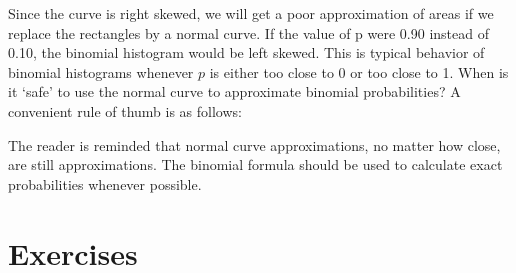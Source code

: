\documentclass[11pt, chapterprefix=true]{scrbook}\usepackage[]{graphicx}\usepackage[]{color}
\begin{document}
Since the curve is right skewed, we will get a poor approximation of areas if we replace the rectangles by a normal curve.  If the value of p were 0.90 instead of 0.10, the binomial histogram would be left skewed.  This is typical behavior of binomial histograms whenever $p$ is either too close to 0 or too close to 1.  When is it `safe' to use the normal curve to approximate binomial probabilities?  A convenient rule of thumb is as follows:


The reader is reminded that normal curve approximations, no matter how close, are still approximations.  The binomial formula should be used to calculate exact probabilities whenever possible.

\twocolumn

\section{Exercises}
\end{document}
